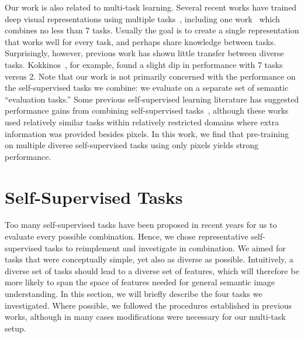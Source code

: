 \documentclass[10pt,twocolumn,letterpaper]{article}
\begin{document}
Our work is also related to multi-task learning.
Several recent works have trained deep visual representations using multiple tasks~\cite{sermanet2013overfeat,eigen2015predicting,gkioxari2015contextual,misra2016cross}, including one work~\cite{kokkinos2016ubernet} which combines no less than 7 tasks.
Usually the goal is to create a single representation that works well for every task, and perhaps share knowledge between tasks.
Surprisingly, however, previous work has shown little transfer between diverse tasks.
Kokkinos~\cite{kokkinos2016ubernet}, for example, found a slight dip in performance with 7 tasks versus 2.  
Note that our work is not primarily 
concerned with the performance on the self-supervised tasks we combine: we evaluate on a separate set of semantic ``evaluation tasks.''  
Some previous self-supervised learning literature has suggested performance gains from combining self-supervised tasks~\cite{pinto2016learning,zamir2016generic}, although these works used relatively similar tasks within relatively restricted domains where extra information was provided besides pixels.  
In this work, we find that pre-training on multiple diverse self-supervised tasks using only pixels yields strong performance.


\section{Self-Supervised Tasks}

\label{sec:tasks}

Too many self-supervised tasks have been proposed in recent years for us to evaluate every possible combination.  
Hence, we chose representative self-supervised tasks to reimplement and investigate in combination.  
We aimed for tasks that were conceptually simple, yet also as diverse as possible.
Intuitively, a diverse set of tasks should lead to a diverse set of features, which will therefore be more likely to span the space of features needed for general semantic image understanding.
In this section, we will briefly describe the four tasks we investigated.
Where possible, we followed the procedures established in previous works, although in many cases modifications were necessary for our multi-task setup.
\end{document}
